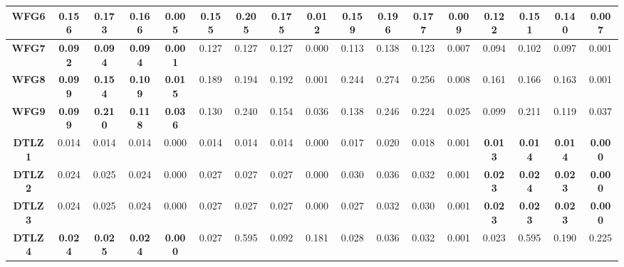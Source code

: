 \begin{table*}[t]
{\begin{tabular}{cc|c|c|c|c|c|c|c|c|c|c|c|c|c|c|c}
\multicolumn{1}{c|}{\textbf{WFG6}}  & 0.156          & 0.173          & 0.166          & 0.005         & 0.155        & 0.205        & 0.175         & 0.012        & 0.159        & 0.196        & 0.177         & 0.009        & \textbf{0.122} & \textbf{0.151} & \textbf{0.140} & \textbf{0.007}  \\ \hline
\multicolumn{1}{c|}{\textbf{WFG7}}  & \textbf{0.092} & \textbf{0.094} & \textbf{0.094} & \textbf{0.001}& 0.127        & 0.127        & 0.127         & 0.000        & 0.113        & 0.138        & 0.123         & 0.007        & 0.094          & 0.102          & 0.097          & 0.001           \\ \hline
\multicolumn{1}{c|}{\textbf{WFG8}}  & \textbf{0.099} & \textbf{0.154} & \textbf{0.109} & \textbf{0.015}& 0.189        & 0.194        & 0.192         & 0.001        & 0.244        & 0.274        & 0.256         & 0.008        & 0.161          & 0.166          & 0.163          & 0.001           \\ \hline
\multicolumn{1}{c|}{\textbf{WFG9}}  & \textbf{0.099} & \textbf{0.210} & \textbf{0.118} & \textbf{0.036}& 0.130        & 0.240        & 0.154         & 0.036        & 0.138        & 0.246        & 0.224         & 0.025        & 0.099          & 0.211          & 0.119          & 0.037           \\ \hline
\multicolumn{1}{c|}{\textbf{DTLZ1}} & 0.014          & 0.014          & 0.014          & 0.000         & 0.014        & 0.014        & 0.014         & 0.000        & 0.017        & 0.020        & 0.018         & 0.001        & \textbf{0.013} & \textbf{0.014} & \textbf{0.014} & \textbf{0.000}  \\ \hline
\multicolumn{1}{c|}{\textbf{DTLZ2}} & 0.024          & 0.025          & 0.024          & 0.000         & 0.027        & 0.027        & 0.027         & 0.000        & 0.030        & 0.036        & 0.032         & 0.001        & \textbf{0.023} & \textbf{0.024} & \textbf{0.023} & \textbf{0.000}  \\ \hline
\multicolumn{1}{c|}{\textbf{DTLZ3}} & 0.024          & 0.025          & 0.024          & 0.000         & 0.027        & 0.027        & 0.027         & 0.000        & 0.027        & 0.032        & 0.030         & 0.001        & \textbf{0.023} & \textbf{0.023} & \textbf{0.023} & \textbf{0.000}  \\ \hline
\multicolumn{1}{c|}{\textbf{DTLZ4}} & \textbf{0.024} & \textbf{0.025} & \textbf{0.024} & \textbf{0.000}& 0.027        & 0.595        & 0.092         & 0.181        & 0.028        & 0.036        & 0.032         & 0.001        & 0.023          & 0.595          & 0.190          & 0.225           \\ \hline

\end{tabular}}
\end{table*}
